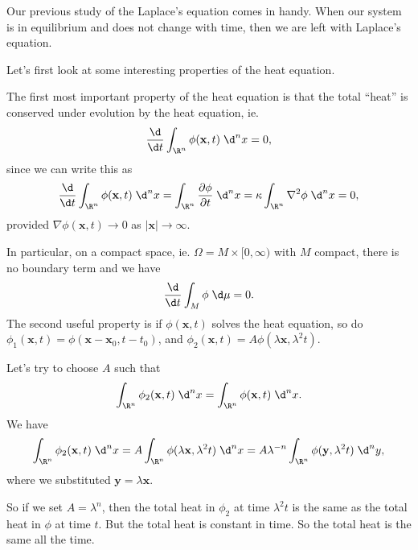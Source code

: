 \documentclass[a4paper]{article}
\begin{document}
Our previous study of the Laplace's equation comes in handy. When our system is in equilibrium and does not change with time, then we are left with Laplace's equation.

Let's first look at some interesting properties of the heat equation.

The first most important property of the heat equation is that the total ``heat'' is conserved under evolution by the heat equation, ie.
\[
  \frac{\d}{\d t}\int_{\R^n} \phi(\mathbf{x}, t)\;\d^n x = 0,
\]
since we can write this as
\[
  \frac{\d}{\d t}\int_{\R^n} \phi(\mathbf{x}, t)\;\d^n x = \int_{\R^n} \frac{\partial \phi}{\partial t}\; \d^n x = \kappa \int_{\R^n} \nabla^2 \phi \;\d^n x = 0,
\]
provided $\nabla \phi(\mathbf{x}, t) \to 0$ as $|\mathbf{x}|\to \infty$.

In particular, on a compact space, ie. $\Omega = M\times [0, \infty)$ with $M$ compact, there is no boundary term and we have
\[
  \frac{\d}{\d t}\int_M \phi \;\d\mu = 0.
\]
The second useful property is if $\phi(\mathbf{x}, t)$ solves the heat equation, so do $\phi_1(\mathbf{x}, t) = \phi(\mathbf{x} - \mathbf{x}_0, t - t_0)$, and $\phi_2(\mathbf{x}, t) = A \phi(\lambda \mathbf{x}, \lambda^2 t)$.

Let's try to choose $A$ such that
\[
  \int_{\R^n}\phi_2(\mathbf{x}, t) \;\d^n x = \int_{\R^n}\phi(\mathbf{x}, t) \;\d^n x.
\]
We have
\[
  \int_{\R^n} \phi_2(\mathbf{x}, t)\;\d^n x = A\int_{\R^n}\phi(\lambda \mathbf{x}, \lambda^2 t)\;\d^n x = A\lambda^{-n} \int_{\R^n}\phi(\mathbf{y}, \lambda^2 t)\;\d^n y,
\]
where we substituted $\mathbf{y} = \lambda \mathbf{x}$.

So if we set $A = \lambda^n$, then the total heat in $\phi_2$ at time $\lambda^2 t$ is the same as the total heat in $\phi$ at time $t$. But the total heat is constant in time. So the total heat is the same all the time.
\end{document}
